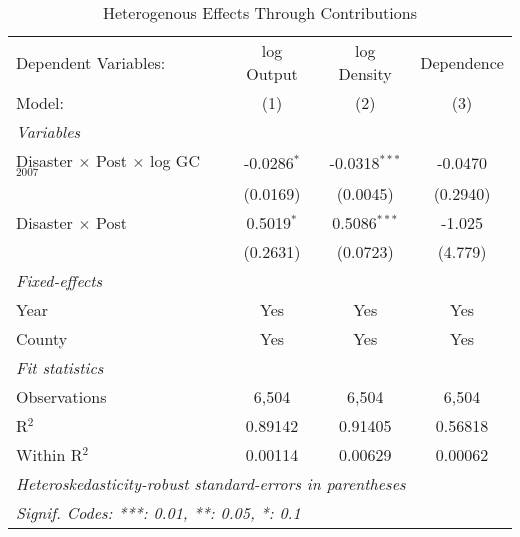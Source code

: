 
\begin{table}[htbp]
   \caption{Heterogenous Effects Through Contributions}
   \centering
   \begin{adjustbox}{max width = \textwidth, center}
      \begin{tabular}{lccc}
         \tabularnewline \midrule \midrule
         Dependent Variables:                              & log Output    & log Density     & Dependence\\  
         Model:                                            & (1)           & (2)             & (3)\\  
         \midrule
         \emph{Variables}\\
         Disaster $\times$ Post $\times$ log GC$_{2007}$   & -0.0286$^{*}$ & -0.0318$^{***}$ & -0.0470\\   
                                                           & (0.0169)      & (0.0045)        & (0.2940)\\   
         Disaster $\times$ Post                            & 0.5019$^{*}$  & 0.5086$^{***}$  & -1.025\\   
                                                           & (0.2631)      & (0.0723)        & (4.779)\\   
         \midrule
         \emph{Fixed-effects}\\
         Year                                              & Yes           & Yes             & Yes\\  
         County                                            & Yes           & Yes             & Yes\\  
         \midrule
         \emph{Fit statistics}\\
         Observations                                      & 6,504         & 6,504           & 6,504\\  
         R$^2$                                             & 0.89142       & 0.91405         & 0.56818\\  
         Within R$^2$                                      & 0.00114       & 0.00629         & 0.00062\\  
         \midrule \midrule
         \multicolumn{4}{l}{\emph{Heteroskedasticity-robust standard-errors in parentheses}}\\
         \multicolumn{4}{l}{\emph{Signif. Codes: ***: 0.01, **: 0.05, *: 0.1}}\\
      \end{tabular}
   \end{adjustbox}
\end{table}


